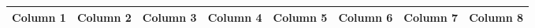 


\begin{landscape} %

\scriptsize            %
\tabulinesep=1.2mm     %
\singlespacing         %

\begin{longtabu}to     


\hline 
       \footnotesize\textbf{Column 1} &  
       \footnotesize\textbf{Column 2} & 
       \footnotesize\textbf{Column 3} & 
       \footnotesize\textbf{Column 4} & 
       \footnotesize\textbf{Column 5} & 
       \footnotesize\textbf{Column 6} & 
       \footnotesize\textbf{Column 7} & 
       \footnotesize\textbf{Column 8}\\
\hline \endhead 


\end{longtabu}
\end{landscape}
